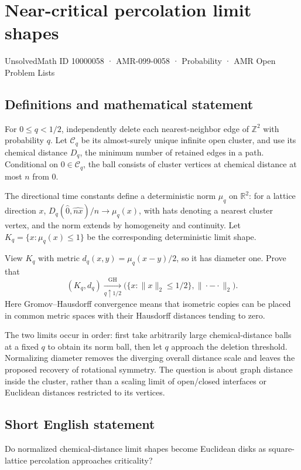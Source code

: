 \documentclass[11pt,a4paper]{article}
\begin{document}
\section*{Near-critical percolation limit shapes}\label{10000058}
{\small UnsolvedMath ID 10000058 · AMR-099-0058 · Probability · AMR Open Problem Lists}
\subsection{Definitions and mathematical statement}
For $0\le q<1/2$, independently delete each nearest-neighbor edge of $\mathbb Z^2$ with probability $q$. Let $\mathcal C_q$ be its almost-surely unique infinite open cluster, and use its chemical distance $D_q$, the minimum number of retained edges in a path. Conditional on $0\in\mathcal C_q$, the ball consists of cluster vertices at chemical distance at most $n$ from $0$.

The directional time constants define a deterministic norm $\mu_q$ on $\mathbb R^2$: for a lattice direction $x$, $D_q(\widehat0,\widehat{nx})/n\to\mu_q(x)$, with hats denoting a nearest cluster vertex, and the norm extends by homogeneity and continuity. Let $K_q=\{x:\mu_q(x)\le1\}$ be the corresponding deterministic limit shape.

View $K_q$ with metric $d_q(x,y)=\mu_q(x-y)/2$, so it has diameter one. Prove that
\[
(K_q,d_q)\xrightarrow[q\uparrow1/2]{\mathrm{GH}}
\bigl(\{x:\|x\|_2\le1/2\},\|\cdot-\cdot\|_2\bigr).
\]
Here Gromov--Hausdorff convergence means that isometric copies can be placed in common metric spaces with their Hausdorff distances tending to zero.

The two limits occur in order: first take arbitrarily large chemical-distance balls at a fixed $q$ to obtain its norm ball, then let $q$ approach the deletion threshold. Normalizing diameter removes the diverging overall distance scale and leaves the proposed recovery of rotational symmetry. The question is about graph distance inside the cluster, rather than a scaling limit of open/closed interfaces or Euclidean distances restricted to its vertices.
\subsection{Short English statement}
Do normalized chemical-distance limit shapes become Euclidean disks as square-lattice percolation approaches criticality?
\end{document}

